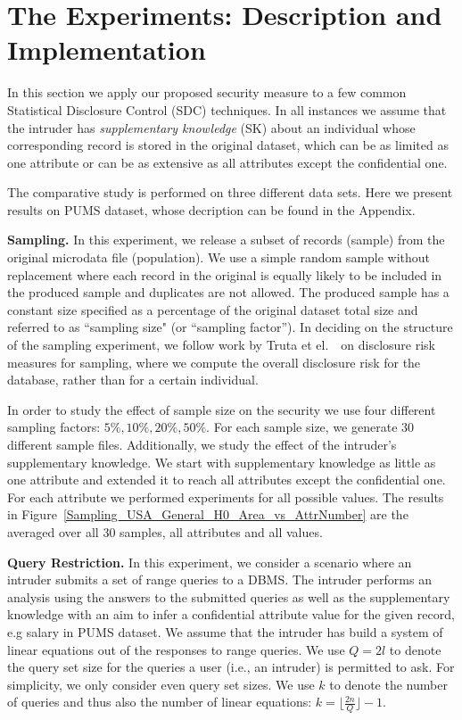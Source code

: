 \documentclass{llncs}
\begin{document}
\section{The Experiments: Description and Implementation}
In this section we apply our proposed security measure to a few
common Statistical Disclosure Control (SDC) techniques. In all
instances we assume that the intruder has \emph{supplementary
knowledge} (SK) about an individual whose corresponding record is
stored in the original dataset, which  can be as limited as one
attribute or can be as extensive as all attributes except the
confidential one.


The comparative study is performed on three different data sets.
Here we present results on PUMS dataset, whose decription can be found in the Appendix.


\textbf{Sampling.} In this experiment, we release a subset of records (sample) from
the original microdata file (population). We use a simple random
sample without replacement where each record in the original is
equally likely to be included in the produced sample and
duplicates are not allowed. The produced sample has a constant
size specified as a percentage of the original dataset total size
and referred to as ``sampling size" (or ``sampling factor''). In deciding on the
structure of the sampling experiment, we follow work by Truta et
el.~\cite{Truta-Fotouhi:Disclosure04}~on disclosure risk measures
for sampling, where we compute the overall disclosure risk for the
database, rather than for a certain
individual.


In order to study the effect of sample size on the security we use
four different sampling factors: $5\%,10\%,20\%,50\%$. For each
sample size, we generate $30$ different sample files.
Additionally, we study the effect of the intruder's supplementary
knowledge. We start with supplementary knowledge as little as one
attribute and extended it to reach all attributes except the
confidential one. For each attribute we performed experiments for
all possible values. The results in
Figure~\ref{Sampling_USA_General_H0_Area_vs_AttrNumber} are the
averaged over all 30 samples, all attributes and all values.

\textbf{Query Restriction.} In this experiment, we consider a scenario where an intruder
submits a set of range queries to a DBMS. The intruder performs an
analysis using the answers to the submitted queries as well as the
supplementary knowledge with an aim to infer a confidential
attribute value for the given record, e.g salary in PUMS dataset.
We assume that the intruder has build a system of linear equations
out of the responses to range queries. We use $Q=2l$ to denote the
query set size for the queries a user (i.e., an intruder) is
permitted to ask. For simplicity, we only consider
even query set sizes. We use $k$ to denote the number of queries
and thus also the number of linear equations: $k = \lfloor\frac{2n}{Q}\rfloor-1$.
\end{document}
